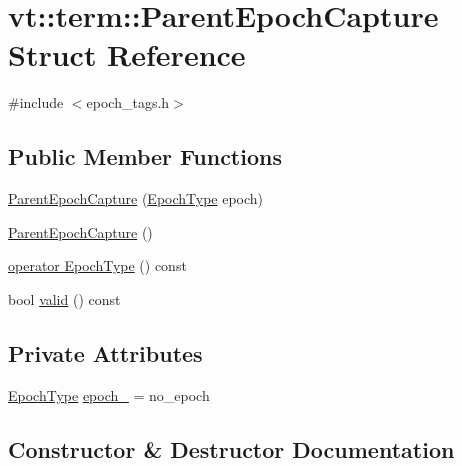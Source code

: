 \hypertarget{structvt_1_1term_1_1_parent_epoch_capture}{}\section{vt\+:\+:term\+:\+:Parent\+Epoch\+Capture Struct Reference}
\label{structvt_1_1term_1_1_parent_epoch_capture}


{\ttfamily \#include $<$epoch\+\_\+tags.\+h$>$}

\subsection*{Public Member Functions}
\begin{DoxyCompactItemize}
\item 
\hyperlink{structvt_1_1term_1_1_parent_epoch_capture_aab8cb84fc9f233d2a03f3f550fccd601}{Parent\+Epoch\+Capture} (\hyperlink{namespacevt_a985a5adf291c34a3ca263b3378388236}{Epoch\+Type} epoch)
\item 
\hyperlink{structvt_1_1term_1_1_parent_epoch_capture_a8a84ae05c8fb68499c6d5e52f2420221}{Parent\+Epoch\+Capture} ()
\item 
\hyperlink{structvt_1_1term_1_1_parent_epoch_capture_a2d719573a4e469b37374b94b5c990d0a}{operator Epoch\+Type} () const
\item 
bool \hyperlink{structvt_1_1term_1_1_parent_epoch_capture_a756a8fa40a0e724ca7ea8b5d7a9a8b45}{valid} () const
\end{DoxyCompactItemize}
\subsection*{Private Attributes}
\begin{DoxyCompactItemize}
\item 
\hyperlink{namespacevt_a985a5adf291c34a3ca263b3378388236}{Epoch\+Type} \hyperlink{structvt_1_1term_1_1_parent_epoch_capture_a1d8ee50cac9b459aed1ec1295afa03ff}{epoch\+\_\+} = no\+\_\+epoch
\end{DoxyCompactItemize}


\subsection{Constructor \& Destructor Documentation}
\mbox{\label{structvt_1_1term_1_1_parent_epoch_capture_aab8cb84fc9f233d2a03f3f550fccd601}} 
